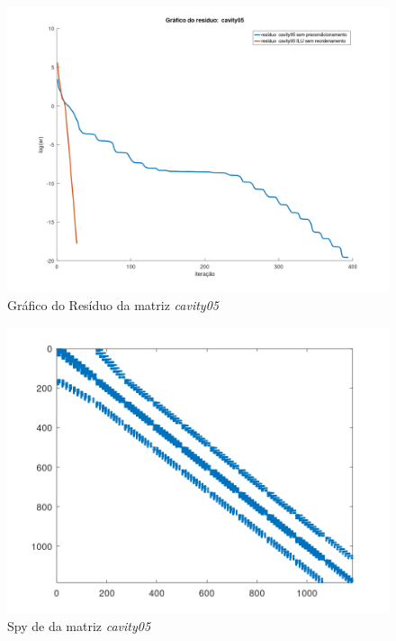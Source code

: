 \begin{figure}[H]
    \centering
         \centering
         \includegraphics[width=.6\linewidth]{images/cavity05.png}
         \caption{Gráfico do Resíduo da matriz \textit{cavity05}}
         \label{fig:cavity-res}
\end{figure}

\begin{figure}[H]
    \centering
         \centering
         \includegraphics[width=.5\linewidth]{images/cavity05_spyA.png}
         \caption{Spy de da matriz \textit{cavity05}}
         \label{fig:cavity-spy-a}
\end{figure}


